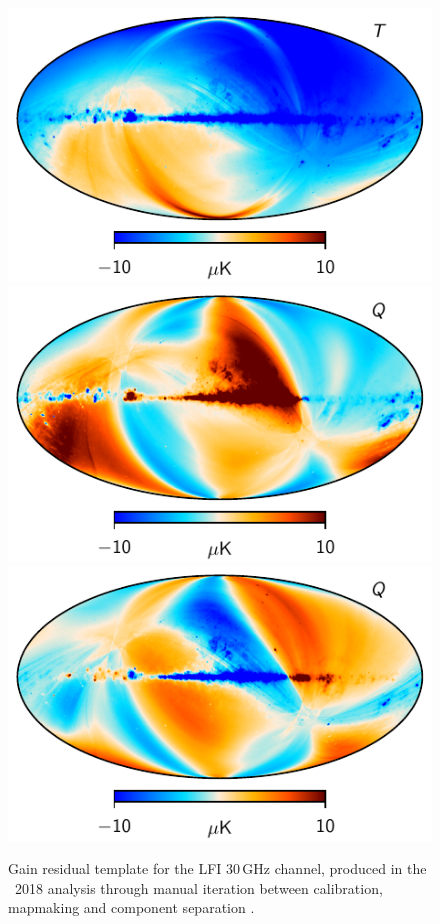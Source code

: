 \documentclass[twocolumn]{aa}
\begin{document}
\begin{figure}[p]
  \center
  \includegraphics[width=0.27\linewidth]{figs/LFI_gain_template_030_T.pdf}
  \includegraphics[width=0.27\linewidth]{figs/LFI_gain_template_030_Q.pdf}
  \includegraphics[width=0.27\linewidth]{figs/LFI_gain_template_030_U.pdf}
    \caption{Gain residual template for the LFI 30\,GHz channel, produced in the \Planck\ 2018 analysis through manual iteration between calibration, mapmaking and component separation \citep{planck2016-l02}.
    }
  \label{fig:gain_template}


  \vspace*{1cm}
  

\end{figure}
\end{document}
